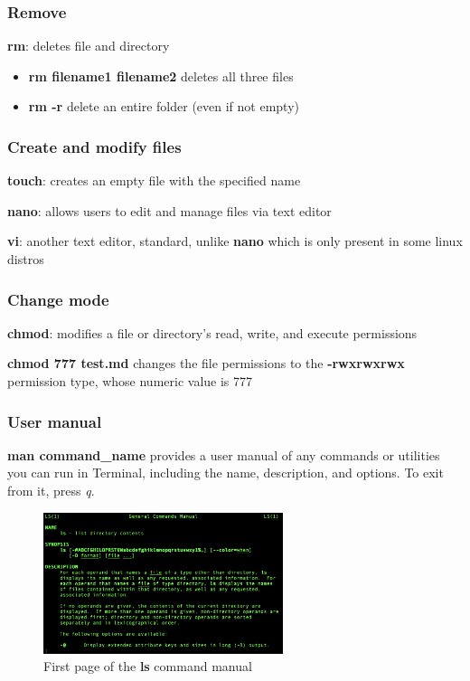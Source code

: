 \documentclass{beamer}
\begin{document}
\begin{frame}
\frametitle{Remove}
\textbf{rm}: deletes file and directory
\begin{example}
\begin{itemize}
\item \textbf{rm filename1 filename2} deletes all three files
\item \textbf{rm -r} delete an entire folder (even if not empty)
\end{itemize}
\end{example}
\end{frame}

\begin{frame}
\frametitle{Create and modify files}
\textbf{touch}: creates an empty file with the specified name

\textbf{nano}: allows users to edit and manage files via text editor

\textbf{vi}: another text editor, standard, unlike \textbf{nano} which is only present in some linux distros
\end{frame}

\begin{frame}
\frametitle{Change mode}
\textbf{chmod}: modifies a file or directory’s read, write, and execute permissions
\begin{example}
\textbf{chmod 777 test.md} changes the file permissions to the \textbf{-rwxrwxrwx} permission type, whose numeric value is 777 
\end{example}
\end{frame}

\begin{frame}
\frametitle{User manual}
\textbf{man command\_name} provides a user manual of any commands or utilities you can run in Terminal, including the name, description, and options. To exit from it, press \emph{q}.
\newline

\begin{figure}[h]
\centering
\includegraphics[width=7cm]{images/man_ls.png}
\caption{First page of the \textbf{ls} command manual}
\end{figure}
\end{frame}
\end{document}
